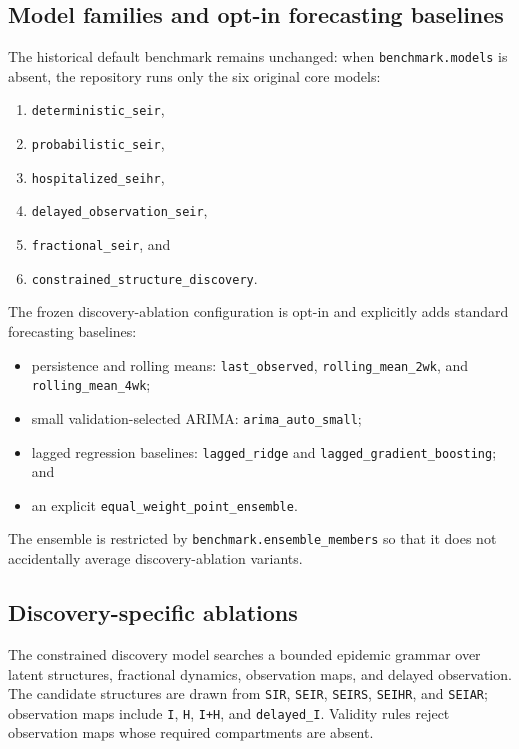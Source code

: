 \subsection{Model families and opt-in forecasting baselines}

The historical default benchmark remains unchanged: when
\texttt{benchmark.models} is absent, the repository runs only the six original
core models:
\begin{enumerate}[leftmargin=1.5em]
\item \texttt{deterministic\_seir},
\item \texttt{probabilistic\_seir},
\item \texttt{hospitalized\_seihr},
\item \texttt{delayed\_observation\_seir},
\item \texttt{fractional\_seir}, and
\item \texttt{constrained\_structure\_discovery}.
\end{enumerate}

The frozen discovery-ablation configuration is opt-in and explicitly adds
standard forecasting baselines:
\begin{itemize}[leftmargin=1.5em]
\item persistence and rolling means:
\texttt{last\_observed}, \texttt{rolling\_mean\_2wk}, and
\texttt{rolling\_mean\_4wk};
\item small validation-selected ARIMA:
\texttt{arima\_auto\_small};
\item lagged regression baselines:
\texttt{lagged\_ridge} and \texttt{lagged\_gradient\_boosting}; and
\item an explicit \texttt{equal\_weight\_point\_ensemble}.
\end{itemize}
The ensemble is restricted by \texttt{benchmark.ensemble\_members} so that it
does not accidentally average discovery-ablation variants.

\subsection{Discovery-specific ablations}

The constrained discovery model searches a bounded epidemic grammar over
latent structures, fractional dynamics, observation maps, and delayed
observation. The candidate structures are drawn from
\texttt{SIR}, \texttt{SEIR}, \texttt{SEIRS}, \texttt{SEIHR}, and
\texttt{SEIAR}; observation maps include \texttt{I}, \texttt{H},
\texttt{I+H}, and \texttt{delayed\_I}. Validity rules reject observation maps
whose required compartments are absent.

